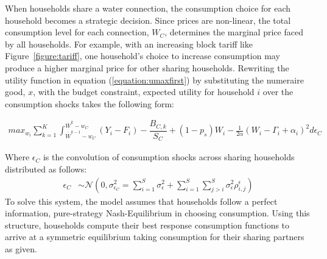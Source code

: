 \documentclass[12pt]{article}
\begin{document}
When households share a water connection, the consumption choice for each household becomes a strategic decision.  Since prices are non-linear, the total consumption level for each connection, $W_C$, determines the marginal price faced by all households.  For example, with an increasing block tariff like Figure~\ref{figure:tariff}, one household's choice to increase consumption may produce a higher marginal price for other sharing households.   Rewriting the utility function in equation (\ref{equation:umaxfirst}) by substituting the numeraire good, $x$, with the budget constraint, expected utility for household $i$ over the consumption shocks takes the following form:


\begin{align*}
max_{w_i} \sum_{k=1}^{K} \int_{\overline{W}^{k-1}-{w_C}}^{\overline{W}^{k}-{w_C}} (Y_i - F_i) -  \dfrac{ B_{C,k} }{S_C}     + (1-p_s) W_i   - \frac{1}{2\alpha } ( W_i - \Gamma_i + \alpha_i )^2  d \epsilon_C 
\end{align*}

Where $\epsilon_C$ is the convolution of consumption shocks across sharing households distributed as follows:
\begin{align*}
          \epsilon_C &\sim \mathcal{N}(0,\sigma_{\epsilon_C}^2 = \sum_{i=1}^{S} \sigma_{\epsilon}^2 + \sum_{i=1}^{S} \sum_{j>i}^{S} \sigma_{\epsilon}^2 \rho^{\epsilon}_{i,j} )
\end{align*}
To solve this system, the model assumes that households follow a perfect information, pure-strategy Nash-Equilibrium in choosing consumption.  Using this structure, households compute their best response consumption functions to arrive at a symmetric equilibrium taking consumption for their sharing partners as given.  
\end{document}
